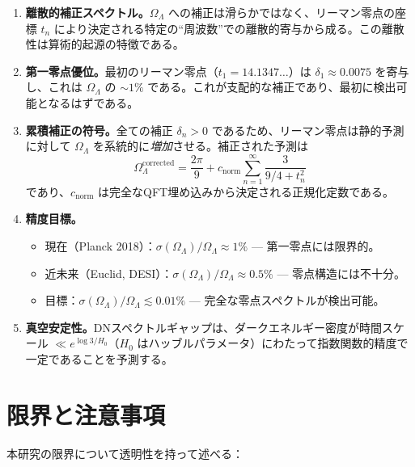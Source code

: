 \documentclass[12pt,a4paper]{article}
\newcommand{\OL}{\Omega_\Lambda}
\begin{document}
\begin{enumerate}[label=\textbf{P\arabic*.}]
\item \textbf{離散的補正スペクトル。}$\OL$ への補正は滑らかではなく、リーマン零点の座標 $t_n$ により決定される特定の``周波数''での離散的寄与から成る。この離散性は算術的起源の特徴である。

\item \textbf{第一零点優位。}最初のリーマン零点（$t_1 = 14.1347\ldots$）は $\delta_1 \approx 0.0075$ を寄与し、これは $\OL$ の $\sim 1\%$ である。これが支配的な補正であり、最初に検出可能となるはずである。

\item \textbf{累積補正の符号。}全ての補正 $\delta_n > 0$ であるため、リーマン零点は静的予測に対して $\OL$ を系統的に\emph{増加}させる。補正された予測は
\begin{equation}
  \OL^{\mathrm{corrected}} = \frac{2\pi}{9} + c_{\mathrm{norm}}\sum_{n=1}^{\infty}\frac{3}{9/4 + t_n^2}
\end{equation}
であり、$c_{\mathrm{norm}}$ は完全なQFT埋め込みから決定される正規化定数である。

\item \textbf{精度目標。}
\begin{itemize}
\item 現在（Planck 2018）：$\sigma(\OL)/\OL \approx 1\%$ --- 第一零点には限界的。
\item 近未来（Euclid, DESI）：$\sigma(\OL)/\OL \approx 0.5\%$ --- 零点構造には不十分。
\item 目標：$\sigma(\OL)/\OL \lesssim 0.01\%$ --- 完全な零点スペクトルが検出可能。
\end{itemize}

\item \textbf{真空安定性。}DNスペクトルギャップは、ダークエネルギー密度が時間スケール $\ll e^{\log 3/H_0}$（$H_0$ はハッブルパラメータ）にわたって指数関数的精度で一定であることを予測する。
\end{enumerate}

\section{限界と注意事項}
\label{sec:limitations}

本研究の限界について透明性を持って述べる：
\end{document}
